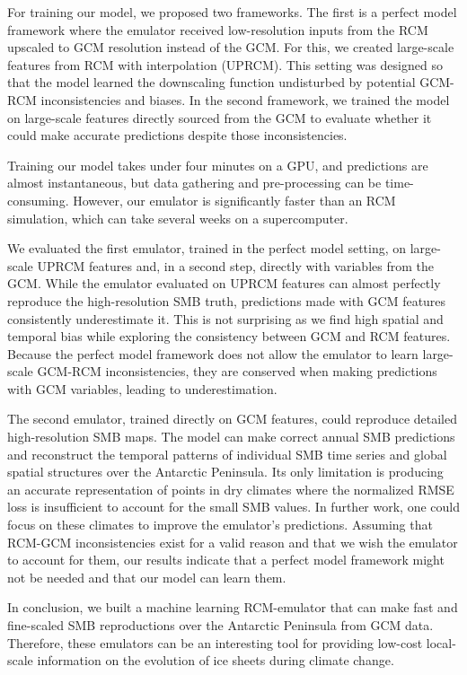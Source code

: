 \documentclass[a4paper,11pt,oneside]{report}
\begin{document}
For training our model, we proposed two frameworks. The first is a perfect model framework where the emulator received low-resolution inputs from the RCM upscaled to GCM resolution instead of the GCM. For this, we created large-scale features from RCM with interpolation (UPRCM). This setting was designed so that the model learned the downscaling function undisturbed by potential GCM-RCM inconsistencies and biases. In the second framework, we trained the model on large-scale features directly sourced from the GCM to evaluate whether it could make accurate predictions despite those inconsistencies. 

Training our model takes under four minutes on a GPU, and predictions are almost instantaneous, but data gathering and pre-processing can be time-consuming. However, our emulator is significantly faster than an RCM simulation, which can take several weeks on a supercomputer. 


We evaluated the first emulator, trained in the perfect model setting, on large-scale UPRCM features and, in a second step, directly with variables from the GCM. While the emulator evaluated on UPRCM features can almost perfectly reproduce the high-resolution SMB truth, predictions made with GCM features consistently underestimate it. This is not surprising as we find high spatial and temporal bias while exploring the consistency between GCM and RCM features. Because the perfect model framework does not allow the emulator to learn large-scale GCM-RCM inconsistencies, they are conserved when making predictions with GCM variables, leading to underestimation. 

The second emulator, trained directly on GCM features, could reproduce detailed high-resolution SMB maps. The model can make correct annual SMB predictions and reconstruct the temporal patterns of individual SMB time series and global spatial structures over the Antarctic Peninsula. Its only limitation is producing an accurate representation of points in dry climates where the normalized RMSE loss is insufficient to account for the small SMB values. In further work, one could focus on these climates to improve the emulator's predictions. Assuming that RCM-GCM inconsistencies exist for a valid reason and that we wish the emulator to account for them, our results indicate that a perfect model framework might not be needed and that our model can learn them.  


In conclusion, we built a machine learning RCM-emulator that can make fast and fine-scaled SMB reproductions over the Antarctic Peninsula from GCM data. Therefore, these emulators can be an interesting tool for providing low-cost local-scale information on the evolution of ice sheets during climate change.
\cleardoublepage
{}
{}
\printbibliography
\appendix
\end{document}
